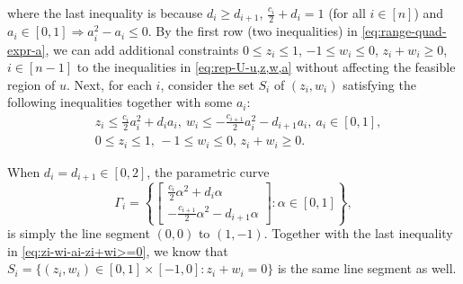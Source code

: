 	where the last inequality is because $d_i \geq d_{i+1}$, $\frac{c_i}{2} + d_i = 1$ (for all $i\in [n]$) and $a_i \in [0,1] \Rightarrow a_i^2 - a_i \leq 0$.
	By the first row (two inequalities) in \eqref{eq:range-quad-expr-a}, we can add additional constraints 
	$0\leq z_i \leq 1$, $-1 \leq w_i\leq 0$, $z_i + w_i \geq 0$, $i\in [n-1]$
	to the inequalities in \eqref{eq:rep-U-u,z,w,a} without affecting the feasible region of $u$. 
	Next, for each $i$, consider the set $S_i$ of $(z_i, w_i)$ satisfying the following inequalities together with some $a_i$:
	\begin{align}
		& z_i \leq \frac{c_i}{2}a_i^2 + d_i a_i,\ w_i \leq - \frac{c_{i+1}}{2} a_i^2 - d_{i+1} a_i,\ a_i \in [0,1], \nonumber \\
		& 0\leq z_i\leq 1, \, -1\leq w_i \leq 0,\, z_i + w_i \geq 0.
		\label{eq:zi-wi-ai-zi+wi>=0}
	\end{align}
	
	When $d_i = d_{i+1} \in [0,2]$, the parametric curve
	\[ \Gamma_i = \left\{ \begin{bmatrix}
		\frac{c_i}{2} \alpha^2 + d_i \alpha \\
		-\frac{c_{i+1}}{2} \alpha^2 - d_{i+1} \alpha
	\end{bmatrix}: \alpha \in [0,1] \right\}, 
	\]
	is simply the line segment $(0,0)$ to $(1,-1)$. Together with the last inequality in \eqref{eq:zi-wi-ai-zi+wi>=0}, we know that
	$ S_i = \{ (z_i, w_i)\in [0,1]\times [-1, 0]: z_i + w_i = 0 \}$
	is the same line segment as well.

